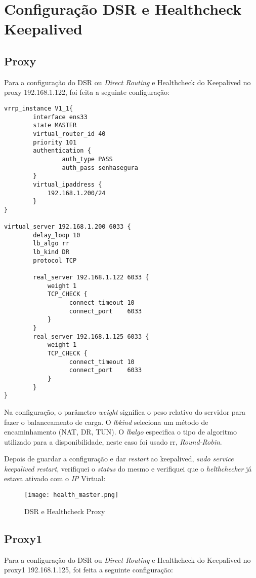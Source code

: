 \newpage
\section{Configuração DSR e Healthcheck Keepalived}
\subsection{Proxy}
Para a configuração do \ac{DSR} ou \textit{Direct Routing} e Healthcheck do Keepalived no proxy 192.168.1.122, foi feita a seguinte configuração:

\begin{verbatim}vrrp_instance V1_1{
    	interface ens33
    	state MASTER
    	virtual_router_id 40
    	priority 101
    	authentication {
        		auth_type PASS
        		auth_pass senhasegura
    	}	
    	virtual_ipaddress {
    		192.168.1.200/24 
    	}
}

virtual_server 192.168.1.200 6033 {
        delay_loop 10
        lb_algo rr
        lb_kind DR
        protocol TCP
    
        real_server 192.168.1.122 6033 {
            weight 1
            TCP_CHECK {
                  connect_timeout 10
                  connect_port    6033
            }
        }
        real_server 192.168.1.125 6033 {
            weight 1
            TCP_CHECK {
                  connect_timeout 10
                  connect_port    6033
            }
        }
}\end{verbatim}

Na configuração, o parâmetro \textit{weight} significa o peso relativo do servidor para fazer o balanceamento de carga. O \textit{lb\textunderscore  kind} seleciona um método de encaminhamento (NAT, DR, TUN). O \textit{lb\textunderscore algo} especifica o tipo de algoritmo utilizado para a disponibilidade, neste caso foi usado rr, \textit{Round-Robin}.


\newpage
Depois de guardar a configuração e dar \textit{restart} ao keepalived, \textit{sudo service keepalived restart}, verifiquei o \textit{status} do mesmo e verifiquei que o \textit{helthchecker} já estava ativado com o \textit{IP} Virtual:

\begin{figure}[H]
\center
\texttt{[image: health\_master.png]}
\caption{DSR e Healthcheck Proxy}
\end{figure}

\subsection{Proxy1}
Para a configuração do \ac{DSR} ou \textit{Direct Routing} e Healthcheck do Keepalived no proxy1 192.168.1.125, foi feita a seguinte configuração:

